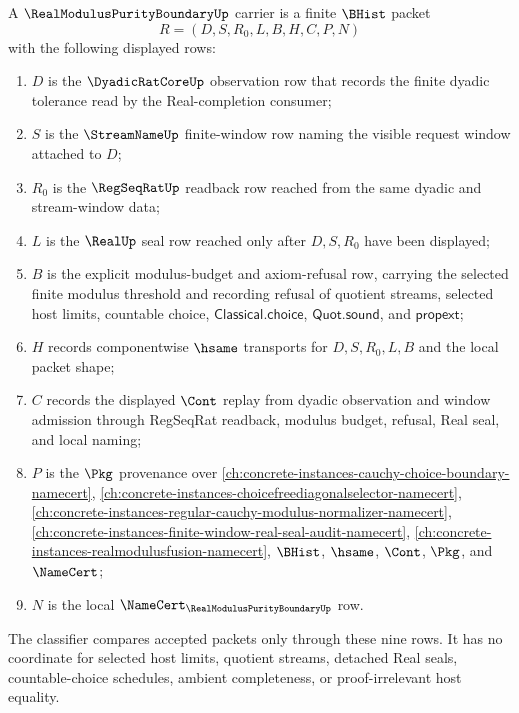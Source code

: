 \begin{definition}
\label{def:real-modulus-purity-boundary-carrier}
A $\RealModulusPurityBoundaryUp$ carrier is a finite $\BHist$ packet
$$
R=(D,S,R_0,L,B,H,C,P,N)
$$
with the following displayed rows:
\begin{enumerate}
\item $D$ is the $\DyadicRatCoreUp$ observation row that records the finite dyadic tolerance read by the Real-completion consumer;
\item $S$ is the $\StreamNameUp$ finite-window row naming the visible request window attached to $D$;
\item $R_0$ is the $\RegSeqRatUp$ readback row reached from the same dyadic and stream-window data;
\item $L$ is the $\RealUp$ seal row reached only after $D,S,R_0$ have been displayed;
\item $B$ is the explicit modulus-budget and axiom-refusal row, carrying the selected finite modulus threshold and recording refusal of quotient streams, selected host limits, countable choice, $\mathsf{Classical.choice}$, $\mathsf{Quot.sound}$, and $\mathsf{propext}$;
\item $H$ records componentwise $\hsame$ transports for $D,S,R_0,L,B$ and the local packet shape;
\item $C$ records the displayed $\Cont$ replay from dyadic observation and window admission through RegSeqRat readback, modulus budget, refusal, Real seal, and local naming;
\item $P$ is the $\Pkg$ provenance over \autoref{ch:concrete-instances-cauchy-choice-boundary-namecert}, \autoref{ch:concrete-instances-choicefreediagonalselector-namecert}, \autoref{ch:concrete-instances-regular-cauchy-modulus-normalizer-namecert}, \autoref{ch:concrete-instances-finite-window-real-seal-audit-namecert}, \autoref{ch:concrete-instances-realmodulusfusion-namecert}, $\BHist$, $\hsame$, $\Cont$, $\Pkg$, and $\NameCert$;
\item $N$ is the local $\NameCert_{\RealModulusPurityBoundaryUp}$ row.
\end{enumerate}
The classifier compares accepted packets only through these nine rows. It has no coordinate for selected host limits, quotient streams, detached Real seals, countable-choice schedules, ambient completeness, or proof-irrelevant host equality.
\end{definition}

